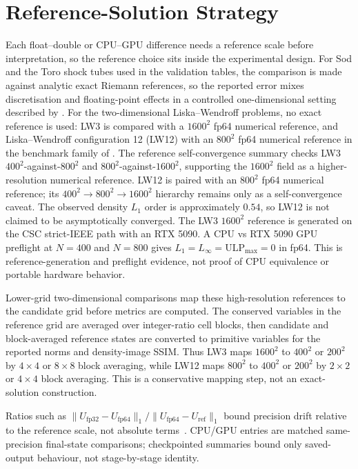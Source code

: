 \section{Reference-Solution Strategy}
Each float--double or CPU--GPU difference needs a reference scale before interpretation,
so the reference choice sits inside the experimental design.
For Sod and the Toro shock tubes used in the validation tables, the comparison
is made against analytic exact Riemann references, so the reported error mixes
discretisation and floating-point effects in a controlled one-dimensional
setting described by \citet{toro2009}. For the two-dimensional
Liska--Wendroff problems, no exact reference is used: LW3 is compared with a
\(1600^2\) fp64 numerical reference, and Liska--Wendroff configuration 12
(LW12) with an \(800^2\) fp64 numerical reference in the benchmark family of
\citet{liska_wendroff_2003}.
The reference self-convergence summary checks LW3 \(400^2\)-against-\(800^2\)
and \(800^2\)-against-\(1600^2\), supporting the \(1600^2\) field as a
higher-resolution numerical reference. LW12 is paired with an \(800^2\) fp64 numerical reference; its \(400^2 \to 800^2 \to 1600^2\) hierarchy remains only as a self-convergence caveat. The observed density \(L_1\) order is approximately \(0.54\), so LW12 is not claimed to be asymptotically converged.
The LW3 \(1600^2\) reference is generated on the CSC strict-IEEE path with an RTX 5090. A CPU vs RTX 5090 GPU preflight at \(N=400\) and \(N=800\) gives \(L_1 = L_\infty = \mathrm{ULP}_{\max} = 0\) in fp64. This is reference-generation and preflight evidence, not proof of CPU equivalence or portable hardware behavior.

Lower-grid two-dimensional comparisons map these high-resolution
references to the candidate grid before metrics are computed. The conserved
variables in the reference grid are averaged over integer-ratio cell blocks,
then candidate and block-averaged reference states are converted to primitive
variables for the reported norms and density-image SSIM. Thus LW3 maps
\(1600^2\) to \(400^2\) or \(200^2\) by \(4\times4\) or \(8\times8\) block
averaging, while LW12 maps \(800^2\) to \(400^2\) or \(200^2\) by \(2\times2\)
or \(4\times4\) block averaging. This is a conservative mapping step, not an
exact-solution construction.

Ratios such as
\(\|U_{\mathrm{fp32}}-U_{\mathrm{fp64}}\|_1/
\|U_{\mathrm{fp64}}-U_{\mathrm{ref}}\|_1\) bound precision drift relative to
the reference scale, not absolute terms~\citep{higham_2002}. CPU/GPU entries
are matched same-precision final-state comparisons; checkpointed summaries
bound only saved-output behaviour, not stage-by-stage identity.

